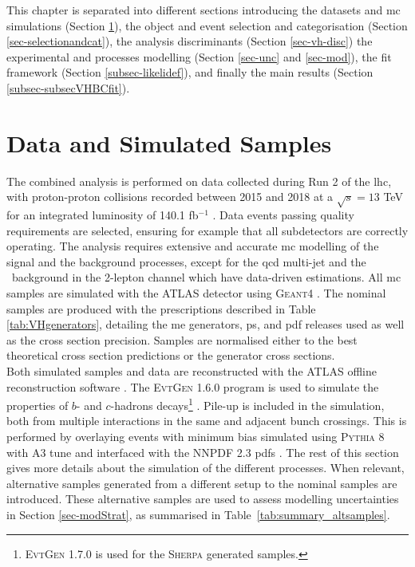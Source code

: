 This chapter is separated into different sections introducing the datasets and \gls{mc} simulations (Section \ref{sec-datasets}), the object and event selection and categorisation (Section \ref{sec-selectionandcat}), the analysis discriminants (Section \ref{sec-vh-disc}) the experimental and processes modelling (Section \ref{sec-unc} and \ref{sec-mod}), the fit framework (Section \ref{subsec-likelidef}), and finally the main results (Section \ref{subsec-subsecVHBCfit}).

\section{Data and Simulated Samples}\label{sec-datasets} 
The combined analysis is performed on data collected during Run 2 of the \gls{lhc}, with proton-proton collisions recorded between 2015 and 2018 at a $\sqrt{s} = 13$ TeV for an integrated luminosity of 140.1 fb$^{-1}$ \cite{ATLAS:2022hro}. Data events passing quality requirements are selected, ensuring for example that all subdetectors are correctly operating. The analysis requires extensive and accurate \gls{mc} modelling of the signal and the background processes, except for the \gls{qcd} multi-jet and the \ttb\ background in the 2-lepton channel which have data-driven estimations. All \gls{mc} samples are simulated with the ATLAS detector \cite{ATLASSimulationInfra} using \textsc{Geant4} \cite{Agostinelli:602040}. The nominal samples are produced with the prescriptions described in Table \ref{tab:VHgenerators}, detailing the \gls{me} generators, \gls{ps}, and \gls{pdf} releases used as well as the cross section precision. Samples are normalised either to the best theoretical cross section predictions or the generator cross sections. \\



Both simulated samples and data are reconstructed with the ATLAS offline reconstruction software \cite{ATL-SOFT-PUB-2021-001}. The \textsc{EvtGen} 1.6.0 program is used to simulate the properties of $b$- and $c$-hadrons decays\footnote{\textsc{EvtGen} 1.7.0 is used for the \textsc{Sherpa} generated samples.} \cite{LANGE2001152}. Pile-up is included in the simulation, both from multiple interactions in the same and adjacent bunch crossings. This is performed by overlaying events with minimum bias simulated using \textsc{\textsc{Pythia}} 8 with A3 tune and interfaced with the \textsc{NNPDF} 2.3 \glspl{pdf} \cite{SJOSTRAND2015159}. The rest of this section gives more details about the simulation of the different processes. When relevant, alternative samples generated from a different setup to the nominal samples are introduced. These alternative samples are used to assess modelling uncertainties in Section \ref{sec-modStrat}, as summarised in Table~\ref{tab:summary_altsamples}.

